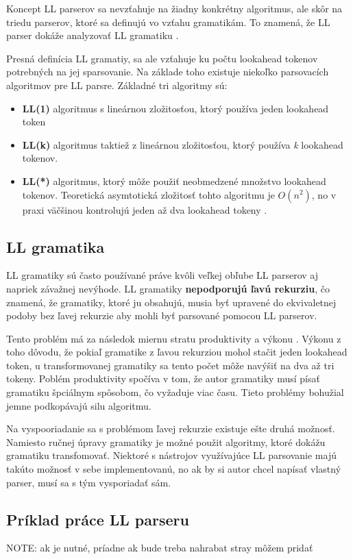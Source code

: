 Koncept LL parserov sa nevzťahuje na žiadny konkrétny algoritmus, ale skôr na triedu parserov, ktoré sa definujú vo vzťahu  gramatikám. To znamená, že LL parser dokáže analyzovať LL gramatiku \cite{haberman:hard_parsing}.

Presná definícia LL gramatiy, sa ale vzťahuje ku počtu lookahead tokenov potrebných na jej sparsovanie. Na základe toho existuje niekoľko parsovacích algoritmov pre LL parsre. Základné tri algoritmy sú:
\begin{itemize}
\item \textbf{LL(1)} algoritmus s lineárnou zložitosťou, ktorý používa jeden lookahead token 
\item \textbf{LL(k)} algoritmus taktiež z lineárnou zložitosťou, ktorý používa \textit{k} lookahead tokenov.
\item \textbf{LL(*)} algoritmus, ktorý môže použiť neobmedzené množstvo lookahead tokenov. Teoretická asymtotická zložitosť tohto algoritmu je $O(n^2)$, no v praxi väčšinou kontrolujú jeden až dva lookahead tokeny \cite{LL}.
\end{itemize}

\subsection{LL gramatika}
LL gramatiky sú často používané práve kvôli veľkej obľube LL parserov aj napriek závažnej nevýhode. LL gramatiky \textbf{nepodporujú ľavú rekurziu}, čo znamená, že gramatiky, ktoré ju obsahujú, musia byť upravené do ekvivaletnej podoby bez ľavej rekurzie aby mohli byť parsované pomocou LL parserov.

Tento problém má za následok miernu stratu produktivity a výkonu \cite{tomassetti:parsing}. Výkonu z toho dôvodu, že pokiaľ gramatike z ľavou rekurziou mohol stačit jeden lookahead token, u transformovanej gramatiky sa tento počet môže navýšiť na dva až tri tokeny. Poblém produktivity spočíva v tom, že autor gramatiky musí písať gramatiku špciálnym spôsobom, čo vyžaduje viac času. Tieto problémy bohužial jemne podkopávajú silu algoritmu.

Na vyspooriadanie sa s problémom ľavej rekurzie existuje ešte druhá možnosť. Namiesto ručnej úpravy gramatiky je možné použit algoritmy, ktoré dokážu gramatiku transfomovať. Niektoré s nástrojov využívajúce LL parsovanie majú takúto možnosť v sebe implementovanú, no ak by si autor chcel napísať vlastný parser, musí sa s tým vysporiadať sám.

\subsection{Príklad práce LL parseru}
NOTE: ak je nutné, príadne ak bude treba nahrabat stray môžem pridať

